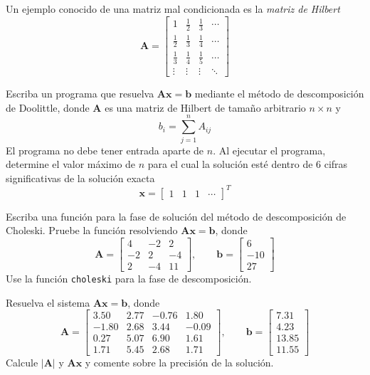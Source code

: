 \documentclass[12pt,letterpaper]{article}
\theoremstyle{definition}
\theoremstyle{plain}
\theoremstyle{remark}
\begin{document}
    {\problem Un ejemplo conocido de una matriz mal condicionada es la \textit{matriz de Hilbert}
    \[
    \mathbf{A} =
    \begin{bmatrix}
    1 & \tfrac{1}{2} & \tfrac{1}{3} & \cdots \\
    \tfrac{1}{2} & \tfrac{1}{3} & \tfrac{1}{4} & \cdots \\
    \tfrac{1}{3} & \tfrac{1}{4} & \tfrac{1}{5} & \cdots \\
    \vdots & \vdots & \vdots & \ddots
    \end{bmatrix}
    \]

    Escriba un programa que resuelva $\mathbf{Ax} = \mathbf{b}$ mediante el método de descomposición de Doolittle, donde $\mathbf{A}$ es una matriz de Hilbert de tamaño arbitrario $n \times n$ y
    \[
    b_i = \sum_{j=1}^{n} A_{ij}
    \]
    El programa no debe tener entrada aparte de $n$. Al ejecutar el programa, determine el valor máximo de $n$ para el cual la solución esté dentro de 6 cifras significativas de la solución exacta
    \[
    \mathbf{x} = \begin{bmatrix}
    1 & 1 & 1 & \cdots
    \end{bmatrix}^T
    \]}

    {\problem Escriba una función para la fase de solución del método de descomposición de Choleski. Pruebe la función resolviendo $\mathbf{Ax} = \mathbf{b}$, donde
    \[
    \mathbf{A} = \begin{bmatrix}
    4 & -2 & 2 \\
    -2 & 2 & -4 \\
    2 & -4 & 11
    \end{bmatrix}, \qquad
    \mathbf{b} = \begin{bmatrix}
    6 \\
    -10 \\
    27
    \end{bmatrix}
    \]
    Use la función \texttt{choleski} para la fase de descomposición.}

    {\problem Resuelva el sistema $\mathbf{Ax} = \mathbf{b}$, donde
    \[
    \mathbf{A} = \begin{bmatrix}
    3.50 & 2.77 & -0.76 & 1.80 \\
    -1.80 & 2.68 & 3.44 & -0.09 \\
    0.27 & 5.07 & 6.90 & 1.61 \\
    1.71 & 5.45 & 2.68 & 1.71
    \end{bmatrix}, \qquad
    \mathbf{b} = \begin{bmatrix}
    7.31 \\
    4.23 \\
    13.85 \\
    11.55
    \end{bmatrix}
    \]
    Calcule $|\mathbf{A}|$ y $\mathbf{Ax}$ y comente sobre la precisión de la solución.}
\end{document}

